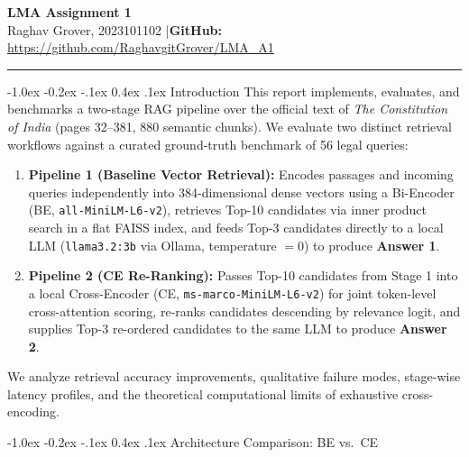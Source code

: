 \documentclass[11pt,a4paper]{article}
\makeatletter
\renewcommand\section{\@startsection{section}{1}{\z@}%
  {-1.0ex \@plus -0.2ex \@minus -.1ex}%
  {0.4ex \@plus .1ex}%
  {\normalfont\large\bfseries\color{primaryblue}}}
\newenvironment{tightcenter}{%
  \setlength\topsep{1.2pt}%
  \setlength\parskip{0pt}%
  \begin{center}%
}{%
  \end{center}%
}
\makeatother
\begin{document}
\begin{tightcenter}
  {\LARGE\textbf{LMA Assignment 1}}\\[0.15em]
  {\large Raghav Grover, 2023101102 \quad|\quad \textbf{GitHub:} \url{https://github.com/RaghavgitGrover/LMA_A1}}
\end{tightcenter}
\vspace{-0.4em}
\hrule
\vspace{0.35em}

\section{Introduction}
\label{sec:intro}
This report implements, evaluates, and benchmarks a two-stage RAG pipeline over the official text of \textit{The Constitution of India} (pages 32--381, 880 semantic chunks). We evaluate two distinct retrieval workflows against a curated ground-truth benchmark of 56 legal queries:
\begin{enumerate}
  \setlength{\itemsep}{0.5pt}\setlength{\parskip}{0pt}
  \item \textbf{Pipeline 1 (Baseline Vector Retrieval):} Encodes passages and incoming queries independently into 384-dimensional dense vectors using a Bi-Encoder (BE, \texttt{all-MiniLM-L6-v2}), retrieves Top-10 candidates via inner product search in a flat FAISS index, and feeds Top-3 candidates directly to a local LLM (\texttt{llama3.2:3b} via Ollama, temperature $= 0$) to produce \textbf{Answer 1}.
  \item \textbf{Pipeline 2 (CE Re-Ranking):} Passes Top-10 candidates from Stage 1 into a local Cross-Encoder (CE, \texttt{ms-marco-MiniLM-L6-v2}) for joint token-level cross-attention scoring, re-ranks candidates descending by relevance logit, and supplies Top-3 re-ordered candidates to the same LLM to produce \textbf{Answer 2}.
\end{enumerate}
We analyze retrieval accuracy improvements, qualitative failure modes, stage-wise latency profiles, and the theoretical computational limits of exhaustive cross-encoding.

\section{Architecture Comparison: BE vs.\ CE}
\label{sec:architecture}
\end{document}
